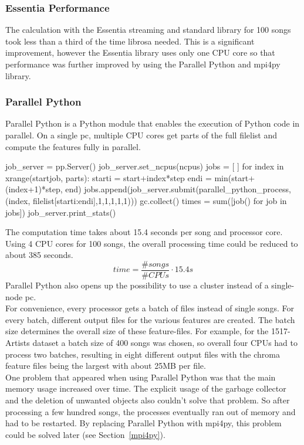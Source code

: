 \subsubsection{Essentia Performance}

The calculation with the Essentia streaming and standard library for 100 songs took less than a third of the time librosa needed. This is a significant improvement, however the Essentia library uses only one CPU core so that performance was further improved by using the Parallel Python and mpi4py library.

\subsubsection{Parallel Python}

Parallel Python is a Python module that enables the execution of Python code in parallel. On a single pc, multiple CPU cores get parts of the full filelist and compute the features fully in parallel.
\begin{pythonCode}[frame=single,label={lst:pp},caption={Parallel Python},captionpos=b]
job_server = pp.Server()
job_server.set_ncpus(ncpus)
jobs = [ ]
for index in xrange(startjob, parts):
	starti = start+index*step
	endi = min(start+(index+1)*step, end)
	jobs.append(job_server.submit(parallel_python_process, (index, filelist[starti:endi],1,1,1,1,1)))
	gc.collect()
times = sum([job() for job in jobs])
job_server.print_stats()
\end{pythonCode}
The computation time takes about 15.4 seconds per song and processor core. Using 4 CPU cores for 100 songs, the overall processing time could be reduced to about 385 seconds. 
\begin{equation} \label{eq:parallelp}
time = \frac{\#songs}{\#CPUs} \cdot 15.4s
\end{equation}
Parallel Python also opens up the possibility to use a cluster instead of a single-node pc.\\
For convenience, every processor gets a batch of files instead of single songs. For every batch, different output files for the various features are created. The batch size determines the overall size of these feature-files. For example, for the 1517-Artists dataset a batch size of 400 songs was chosen, so overall four CPUs had to process two batches, resulting in eight different output files with the chroma feature files being the largest with about 25MB per file.\\
One problem that appeared when using Parallel Python was that the main memory usage increased over time. The explicit usage of the garbage collector and the deletion of unwanted objects also couldn't solve that problem. So after processing a few hundred songs, the processes eventually ran out of memory and had to be restarted. By replacing Parallel Python with mpi4py, this problem could be solved later (see Section~\ref{mpi4py}). 

